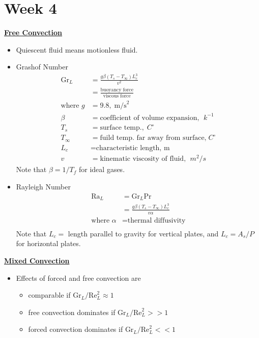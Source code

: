 \section{Week 4}
\underline{\Large \textbf{Free Convection}}


\begin{itemize}
    \item \color{blue} Quiescent fluid \color{black} means motionless fluid.
    \item \color{red}Grashof Number\color{black}
    \begin{align*}
        \text{Gr}_{L} &= \frac{g \beta (T_s- T_{\infty}) L_c^3}{v^2} \\ 
        &= \frac{\text{buoyancy force}}{\text{viscous force}} \\
        \text{where } g &= 9.8, \; \text{m/s}^2 \\
        \beta &= \text{coefficient of volume expansion, }\; k^{-1} \\
        T_s &= \text{surface temp.},\;C^{\circ} \\
        T_{\infty} &= \text{fuild temp. far away from surface,}\; C^{\circ}\\
        L_c &= \text{characteristic length, m}\\
        v &= \text{kinematic viscosity of fluid, }\;m^2/s
    \end{align*}
    Note that $\beta = 1/T_f$ for ideal gases.
    \item \color{red} Rayleigh Number\color{black}
    \begin{align*}
        \text{Ra}_L &= \text{Gr}_L \text{Pr}\\
        &= \frac{g\beta (T_s - T_{\infty})L_c^3}{v \alpha } \\
        \text{where } \alpha &= \text{thermal diffusivity} \\
    \end{align*}
    Note that $L_c = $ length parallel to gravity for vertical plates, and $L_c=A_s / P$ for horizontal plates. 
\end{itemize}
\underline{\textbf{Mixed Convection}}
\begin{itemize}
    \item Effects of \color{blue} forced \color{black} and \color{blue} free convection \color{black} are
    \begin{itemize}
        \item comparable if $\text{Gr}_L/\text{Re}_L^2 \approx 1$
        \item free convection dominates if $\text{Gr}_L/\text{Re}_L^2 >> 1$
        \item forced convection dominates if $\text{Gr}_L/\text{Re}_L^2 << 1$
    \end{itemize}
\end{itemize}

